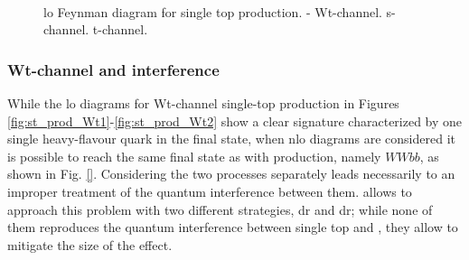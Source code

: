 \begin{figure}[h]
\centering 
{}
 \\
\caption{\Gls{lo} Feynman diagram for single top production. - Wt-channel. 
 s-channel.  t-channel.}\label{fig:single_top_prod}
\end{figure}

\subsubsection*{Wt-channel and \ttbar interference}

While the \gls{lo} diagrams for Wt-channel single-top production in Figures \ref{fig:st_prod_Wt1}-\ref{fig:st_prod_Wt2} show a clear signature characterized by one single heavy-flavour quark in the final state,
when \gls{nlo} diagrams are considered it is possible to reach the same final state as with \ttbar production, namely $WWbb$, as shown in Fig. \ref{}. 
Considering the two processes separately leads necessarily to an improper treatment of the quantum interference between them.
\PowhegBox allows to approach this problem with two different strategies, \gls{dr} and \gls{dr}; while none of them reproduces the quantum interference between single top and \ttbar, they allow to mitigate the size of the effect. 

